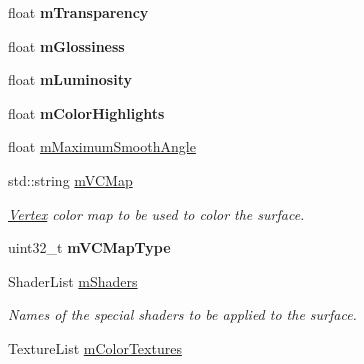 \begin{DoxyCompactItemize}
\item 
\hypertarget{struct_assimp_1_1_l_w_o_1_1_surface_ae1ce1d0f0305768d066617ebba6cfcc6}{float {\bfseries m\+Transparency}}\label{struct_assimp_1_1_l_w_o_1_1_surface_ae1ce1d0f0305768d066617ebba6cfcc6}

\item 
\hypertarget{struct_assimp_1_1_l_w_o_1_1_surface_acd493f3cbddf19c2a3d777488ae87b82}{float {\bfseries m\+Glossiness}}\label{struct_assimp_1_1_l_w_o_1_1_surface_acd493f3cbddf19c2a3d777488ae87b82}

\item 
\hypertarget{struct_assimp_1_1_l_w_o_1_1_surface_ac4c609dd8f7076a7471b986b073abced}{float {\bfseries m\+Luminosity}}\label{struct_assimp_1_1_l_w_o_1_1_surface_ac4c609dd8f7076a7471b986b073abced}

\item 
\hypertarget{struct_assimp_1_1_l_w_o_1_1_surface_a10ee0bbafc9afb344bcde0ecaafd8923}{float {\bfseries m\+Color\+Highlights}}\label{struct_assimp_1_1_l_w_o_1_1_surface_a10ee0bbafc9afb344bcde0ecaafd8923}

\item 
float \hyperlink{struct_assimp_1_1_l_w_o_1_1_surface_ae3deccd83d53dc142d75673fea75885d}{m\+Maximum\+Smooth\+Angle}
\item 
\hypertarget{struct_assimp_1_1_l_w_o_1_1_surface_addd93db10809de53e47041269ec1cdef}{std\+::string \hyperlink{struct_assimp_1_1_l_w_o_1_1_surface_addd93db10809de53e47041269ec1cdef}{m\+V\+C\+Map}}\label{struct_assimp_1_1_l_w_o_1_1_surface_addd93db10809de53e47041269ec1cdef}

\begin{DoxyCompactList}\small\item\em \hyperlink{class_assimp_1_1_vertex}{Vertex} color map to be used to color the surface. \end{DoxyCompactList}\item 
\hypertarget{struct_assimp_1_1_l_w_o_1_1_surface_a429889218c76a67993368f0943c0fb47}{uint32\+\_\+t {\bfseries m\+V\+C\+Map\+Type}}\label{struct_assimp_1_1_l_w_o_1_1_surface_a429889218c76a67993368f0943c0fb47}

\item 
\hypertarget{struct_assimp_1_1_l_w_o_1_1_surface_a58db38c171cf3eccbc24a2ff921640ef}{Shader\+List \hyperlink{struct_assimp_1_1_l_w_o_1_1_surface_a58db38c171cf3eccbc24a2ff921640ef}{m\+Shaders}}\label{struct_assimp_1_1_l_w_o_1_1_surface_a58db38c171cf3eccbc24a2ff921640ef}

\begin{DoxyCompactList}\small\item\em Names of the special shaders to be applied to the surface. \end{DoxyCompactList}\item 
\hypertarget{struct_assimp_1_1_l_w_o_1_1_surface_a006bfdf8ed4b49c10766fe6021cb1346}{Texture\+List \hyperlink{struct_assimp_1_1_l_w_o_1_1_surface_a006bfdf8ed4b49c10766fe6021cb1346}{m\+Color\+Textures}}\label{struct_assimp_1_1_l_w_o_1_1_surface_a006bfdf8ed4b49c10766fe6021cb1346}


\end{DoxyCompactItemize}
